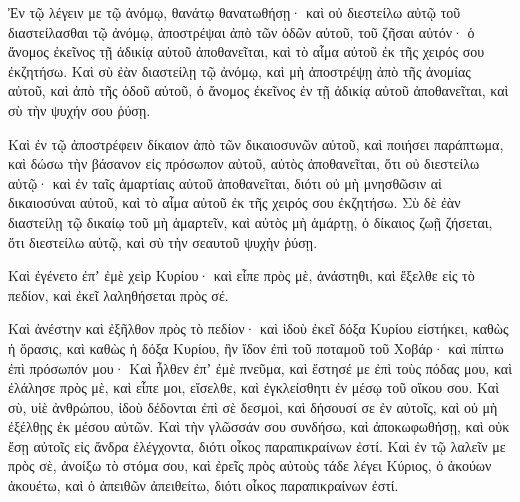 {Ἐν τῷ λέγειν με τῷ ἀνόμῳ, θανάτῳ θανατωθήσῃ· καὶ οὐ διεστείλω αὐτῷ τοῦ διαστείλασθαι τῷ ἀνόμῳ, ἀποστρέψαι ἀπὸ τῶν ὁδῶν αὐτοῦ, τοῦ ζῆσαι αὐτόν· ὁ ἄνομος ἐκεῖνος τῇ ἀδικίᾳ αὐτοῦ ἀποθανεῖται, καὶ τὸ αἷμα αὐτοῦ ἐκ τῆς χειρός σου ἐκζητήσω.
Καὶ σὺ ἐὰν διαστείλῃ τῷ ἀνόμῳ, καὶ μὴ ἀποστρέψῃ ἀπὸ τῆς ἀνομίας αὐτοῦ, καὶ ἀπὸ τῆς ὁδοῦ αὐτοῦ, ὁ ἄνομος ἐκεῖνος ἐν τῇ ἀδικίᾳ αὐτοῦ ἀποθανεῖται, καὶ σὺ τὴν ψυχήν σου ῥύσῃ.
\par }{\PP {}Καὶ ἐν τῷ ἀποστρέφειν δίκαιον ἀπὸ τῶν δικαιοσυνῶν αὐτοῦ, καὶ ποιήσει παράπτωμα, καὶ δώσω τὴν βάσανον εἰς πρόσωπον αὐτοῦ, αὐτὸς ἀποθανεῖται, ὅτι οὐ διεστείλω αὐτῷ· καὶ ἐν ταῖς ἁμαρτίαις αὐτοῦ ἀποθανεῖται, διότι οὐ μὴ μνησθῶσιν αἱ δικαιοσύναι αὐτοῦ, καὶ τὸ αἷμα αὐτοῦ ἐκ τῆς χειρός σου ἐκζητήσω.
Σὺ δὲ ἐὰν διαστείλῃ τῷ δικαίῳ τοῦ μὴ ἁμαρτεῖν, καὶ αὐτὸς μὴ ἁμάρτῃ, ὁ δίκαιος ζωῇ ζήσεται, ὅτι διεστείλω αὐτῷ, καὶ σὺ τὴν σεαυτοῦ ψυχὴν ῥύσῃ.
\par }{\PP {}Καὶ ἐγένετο ἐπʼ ἐμὲ χεὶρ Κυρίου· καὶ εἶπε πρὸς μὲ, ἀνάστηθι, καὶ ἔξελθε εἰς τὸ πεδίον, καὶ ἐκεῖ λαληθήσεται πρὸς σέ.
\par }{\PP {}Καὶ ἀνέστην καὶ ἐξῆλθον πρὸς τὸ πεδίον· καὶ ἰδοὺ ἐκεῖ δόξα Κυρίου εἱστήκει, καθὼς ἡ ὅρασις, καὶ καθὼς ἡ δόξα Κυρίου, ἣν ἴδον ἐπὶ τοῦ ποταμοῦ τοῦ Χοβάρ· καὶ πίπτω ἐπὶ πρόσωπόν μου·
Καὶ ἦλθεν ἐπʼ ἐμὲ πνεῦμα, καὶ ἔστησέ με ἐπὶ τοὺς πόδας μου, καὶ ἐλάλησε πρὸς μὲ, καὶ εἶπε μοι, εἴσελθε, καὶ ἐγκλείσθητι ἐν μέσῳ τοῦ οἴκου σου.
Καὶ σὺ, υἱὲ ἀνθρώπου, ἰδοὺ δέδονται ἐπὶ σὲ δεσμοὶ, καὶ δήσουσί σε ἐν αὐτοῖς, καὶ οὐ μὴ ἐξέλθῃς ἐκ μέσου αὐτῶν.
Καὶ τὴν γλῶσσάν σου συνδήσω, καὶ ἀποκωφωθήσῃ, καὶ οὐκ ἔσῃ αὐτοῖς εἰς ἄνδρα ἐλέγχοντα, διότι οἶκος παραπικραίνων ἐστί.
Καὶ ἐν τῷ λαλεῖν με πρὸς σὲ, ἀνοίξω τὸ στόμα σου, καὶ ἐρεῖς πρὸς αὐτοὺς τάδε λέγει Κύριος, ὁ ἀκούων ἀκουέτω, καὶ ὁ ἀπειθῶν ἀπειθείτω, διότι οἶκος παραπικραίνων ἐστί.

}
